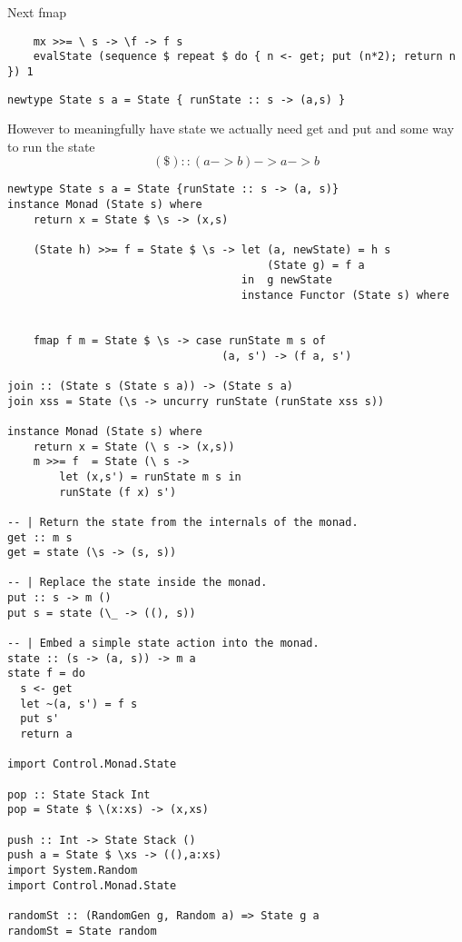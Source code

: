 Next fmap

\begin{verbatim}
    mx >>= \ s -> \f -> f s
    evalState (sequence $ repeat $ do { n <- get; put (n*2); return n }) 1
\end{verbatim}

\begin{verbatim}
newtype State s a = State { runState :: s -> (a,s) }  
\end{verbatim}

However to meaningfully have state we actually need
get and put
and some way to run the state
$$(\$) :: (a -> b) -> a -> b$$

\begin{verbatim}
newtype State s a = State {runState :: s -> (a, s)}
instance Monad (State s) where
    return x = State $ \s -> (x,s)

    (State h) >>= f = State $ \s -> let (a, newState) = h s
                                        (State g) = f a
                                    in  g newState
                                    instance Functor (State s) where


    fmap f m = State $ \s -> case runState m s of
                                 (a, s') -> (f a, s')

join :: (State s (State s a)) -> (State s a)
join xss = State (\s -> uncurry runState (runState xss s))

instance Monad (State s) where
    return x = State (\ s -> (x,s))
    m >>= f  = State (\ s ->
        let (x,s') = runState m s in
        runState (f x) s')

-- | Return the state from the internals of the monad.
get :: m s
get = state (\s -> (s, s))

-- | Replace the state inside the monad.
put :: s -> m ()
put s = state (\_ -> ((), s))

-- | Embed a simple state action into the monad.
state :: (s -> (a, s)) -> m a
state f = do
  s <- get
  let ~(a, s') = f s
  put s'
  return a

import Control.Monad.State

pop :: State Stack Int
pop = State $ \(x:xs) -> (x,xs)

push :: Int -> State Stack ()
push a = State $ \xs -> ((),a:xs)
import System.Random
import Control.Monad.State

randomSt :: (RandomGen g, Random a) => State g a
randomSt = State random
\end{verbatim}

